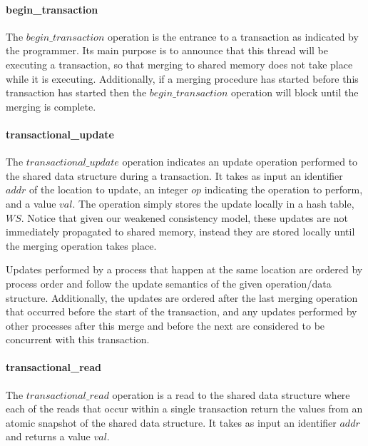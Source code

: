 \documentclass[11pt,letterpaper]{article}
\begin{document}
\paragraph{begin\_transaction}
The $\mathit{begin\_transaction}$ operation is the entrance to
a transaction as indicated by the programmer.
Its main purpose is to announce that this thread will be executing
a transaction, so that merging to shared memory does not take place
while it is executing.
Additionally, if a merging procedure has started before this transaction
has started then the $\mathit{begin\_transaction}$ operation will
block until the merging is complete.




\paragraph{transactional\_update}
The $\mathit{transactional\_update}$ operation indicates an update operation
performed to the shared data structure during a transaction.
It takes as input an identifier $\mathit{addr}$ of the location to update,
an integer $\mathit{op}$ indicating the operation to perform, and a value $\mathit{val}$.
The operation simply stores the update locally in a hash table, $\mathit{WS}$.
Notice that given our weakened consistency model, these updates are not
immediately propagated to shared memory, instead
they are stored locally until the merging operation takes place.

Updates performed by a process that happen at the same location are ordered by process order and
follow the update semantics of the given operation/data structure.
Additionally, the updates are ordered after the last merging operation that occurred before
the start of the transaction, and any updates performed by other processes after this merge and before
the next are considered to be concurrent with this transaction.


\paragraph{transactional\_read}
The $\mathit{transactional\_read}$ operation is a read to the shared data structure
where each of the reads that occur within a single transaction return the values from
an atomic snapshot of the shared data structure.
It takes as input an identifier $\mathit{addr}$ and returns a value $\mathit{val}$.
\end{document}
